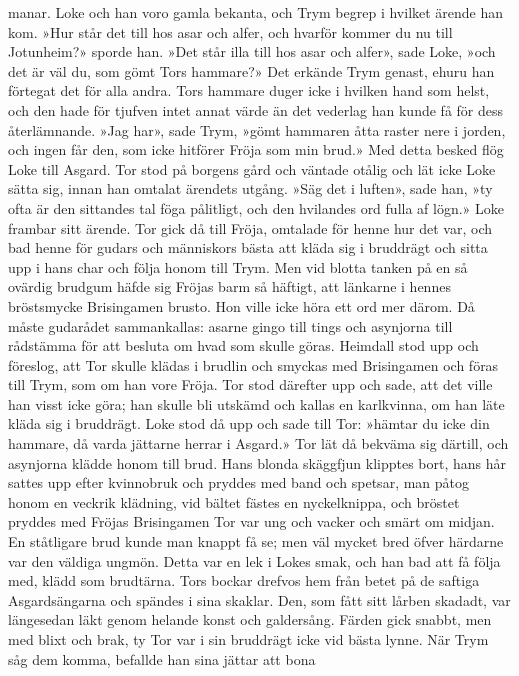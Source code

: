 manar. Loke och han voro gamla bekanta, och Trym begrep i hvilket ärende
han kom. »Hur står det till hos asar och alfer, och hvarför kommer du nu
till Jotunheim?» sporde han. »Det står illa till hos asar och alfer»,
sade Loke, »och det är väl du, som gömt Tors hammare?» Det erkände Trym
genast, ehuru han förtegat det för alla andra. Tors hammare duger icke i
hvilken hand som helst, och den hade för tjufven intet annat värde än
det vederlag han kunde få för dess återlämnande. »Jag har», sade Trym,
»gömt hammaren åtta raster nere i jorden, och ingen får den, som icke
hitförer Fröja som min brud.» Med detta besked flög Loke till Asgard.
Tor stod på borgens gård och väntade otålig och lät icke Loke sätta sig,
innan han omtalat ärendets utgång. »Säg det i luften», sade han, »ty
ofta är den sittandes tal föga pålitligt, och den hvilandes ord fulla af
lögn.» Loke frambar sitt ärende. Tor gick då till Fröja, omtalade för
henne hur det var, och bad henne för gudars och människors bästa att
kläda sig i bruddrägt och sitta upp i hans char och följa honom till
Trym. Men vid blotta tanken på en så ovärdig brudgum häfde sig Fröjas
barm så häftigt, att länkarne i hennes bröstsmycke Brisingamen brusto.
Hon ville icke höra ett ord mer därom. Då måste gudarådet sammankallas:
asarne gingo till tings och asynjorna till rådstämma för att besluta om
hvad som skulle göras. Heimdall stod upp och föreslog, att Tor skulle
klädas i brudlin och smyckas med Brisingamen och föras till Trym, som om
han vore Fröja. Tor stod därefter upp och sade, att det ville han visst
icke göra; han skulle bli utskämd och kallas en karlkvinna, om han läte
kläda sig i bruddrägt. Loke stod då upp och sade till Tor: »hämtar du
icke din hammare, då varda jättarne herrar i Asgard.» Tor lät då bekväma
sig därtill, och asynjorna klädde honom till brud. Hans blonda skäggfjun
klipptes bort, hans hår sattes upp efter kvinnobruk och pryddes med band
och spetsar, man påtog honom en veckrik klädning, vid bältet fästes en
nyckelknippa, och bröstet pryddes med Fröjas
Brisingamen
Tor var ung och vacker och smärt om midjan. En ståtligare brud kunde man
knappt få se; men väl mycket bred öfver härdarne var den väldiga ungmön.
Detta var en lek i Lokes smak, och han bad att få följa med, klädd som
brudtärna. Tors bockar drefvos hem från betet på de saftiga
Asgardsängarna och spändes i sina skaklar. Den, som fått sitt lårben
skadadt, var längesedan läkt genom helande konst och galdersång. Färden
gick snabbt, men med blixt och brak, ty Tor var i sin bruddrägt icke vid
bästa lynne. När Trym såg dem komma, befallde han sina jättar att bona
